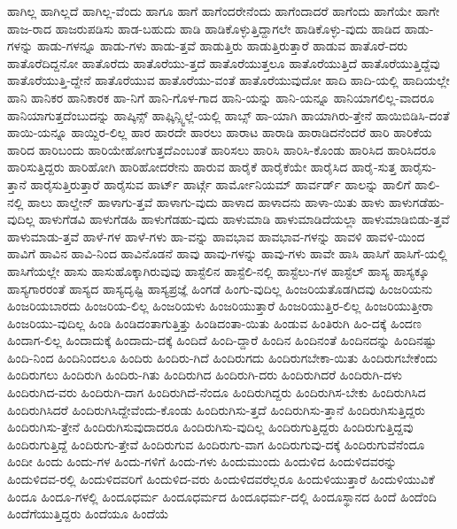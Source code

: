 {ಹಾಗಿಲ್ಲ
ಹಾಗಿಲ್ಲದೆ
ಹಾಗಿಲ್ಲ-ವೆಂದು
ಹಾಗೂ
ಹಾಗೆ
ಹಾಗೆಂದರೇನೆಂದು
ಹಾಗೆಂದಾದರೆ
ಹಾಗೆಂದು
ಹಾಗೆಯೇ
ಹಾಗೇ
ಹಾಜ-ರಾದ
ಹಾಜರುಪಡಿಸು
ಹಾಡ-ಬಹುದು
ಹಾಡಿ
ಹಾಡಿಕೊಳ್ಳುತ್ತಿದ್ದಾಗಲೇ
ಹಾಡಿಕೊಳ್ಳು-ವುದು
ಹಾಡಿದ
ಹಾಡು-ಗಳನ್ನು
ಹಾಡು-ಗಳನ್ನೂ
ಹಾಡು-ಗಳು
ಹಾಡು-ತ್ತವೆ
ಹಾಡುತ್ತಿರು
ಹಾಡುತ್ತಿರುತ್ತಾರೆ
ಹಾಡುವ
ಹಾತೊರೆ-ದರು
ಹಾತೊರೆದಿದ್ದನೋ
ಹಾತೊರೆದು
ಹಾತೊರೆಯು-ತ್ತದೆ
ಹಾತೊರೆಯುತ್ತಲೂ
ಹಾತೊರೆಯುತ್ತಿದೆ
ಹಾತೊರೆಯುತ್ತಿದ್ದೆವು
ಹಾತೊರೆಯುತ್ತಿ-ದ್ದೇನೆ
ಹಾತೊರೆಯುವ
ಹಾತೊರೆಯು-ವಂತೆ
ಹಾತೊರೆಯುವುದೋ
ಹಾದಿ
ಹಾದಿ-ಯಲ್ಲಿ
ಹಾದಿಯಲ್ಲೇ
ಹಾನಿ
ಹಾನಿಕರ
ಹಾನಿಕಾರಕ
ಹಾ-ನಿಗೆ
ಹಾನಿ-ಗೊಳ-ಗಾದ
ಹಾನಿ-ಯನ್ನು
ಹಾನಿ-ಯನ್ನೂ
ಹಾನಿಯಾಗಲಿಲ್ಲ-ವಾದರೂ
ಹಾನಿಯಾಗುತ್ತದೆಂಬುದನ್ನು
ಹಾಪ್ಕಿನ್ಸ್
ಹಾಫ್ಕಿನ್ಸ್ವಿಲ್ಲೆ-ಯಲ್ಲಿ
ಹಾಬ್ಸ್
ಹಾ-ಯಾಗಿ
ಹಾಯಾಗಿರು-ತ್ತೇನೆ
ಹಾಯಿಬಿಡಿಸಿ-ದಂತೆ
ಹಾಯಿ-ಯನ್ನೂ
ಹಾಯ್ದಿರ-ಲಿಲ್ಲ
ಹಾರ
ಹಾರದೇ
ಹಾರಲು
ಹಾರಾಟ
ಹಾರಾಡಿ
ಹಾರಾಡಿದನೆಂದರೆ
ಹಾರಿ
ಹಾರಿಕೆಯ
ಹಾರಿದ
ಹಾರಿಬಂದು
ಹಾರಿಯೇಹೋಗುತ್ತದೆಎಂಬಂತೆ
ಹಾರಿಸಲು
ಹಾರಿಸಿ
ಹಾರಿಸಿ-ಕೊಂಡು
ಹಾರಿಸಿದ
ಹಾರಿಸಿದರೂ
ಹಾರಿಸುತ್ತಿದ್ದರು
ಹಾರಿಹೋಗಿ
ಹಾರಿಹೋದರೇನು
ಹಾರುವ
ಹಾರೈಕೆ
ಹಾರೈಕೆಯೇ
ಹಾರೈಸಿದ
ಹಾರೈ-ಸುತ್ತ
ಹಾರೈಸು-ತ್ತಾನೆ
ಹಾರೈಸುತ್ತಿರುತ್ತಾರೆ
ಹಾರೈಸುವ
ಹಾರ್ಟ್
ಹಾರ್ಟ್ಗೆ
ಹಾರ್ಮೋನಿಯಮ್
ಹಾರ್ವರ್ಡ್
ಹಾಲನ್ನು
ಹಾಲಿಗೆ
ಹಾಲಿ-ನಲ್ಲಿ
ಹಾಲು
ಹಾಲ್ಡೇನ್
ಹಾಳಾಗು-ತ್ತವೆ
ಹಾಳಾಗು-ವುದು
ಹಾಳಾದ
ಹಾಳಾದನು
ಹಾಳಾ-ಯಿತು
ಹಾಳು
ಹಾಳುಗಡೆಹು-ವುದಿಲ್ಲ
ಹಾಳುಗೆಡವಿ
ಹಾಳುಗೆಡಹಿ
ಹಾಳುಗೆಡಹು-ವುದು
ಹಾಳುಮಾಡಿ
ಹಾಳುಮಾಡಿದೆಯಲ್ಲಾ
ಹಾಳುಮಾಡಿಬಿಡು-ತ್ತವೆ
ಹಾಳುಮಾಡು-ತ್ತವೆ
ಹಾಳೆ-ಗಳ
ಹಾಳೆ-ಗಳು
ಹಾ-ವನ್ನು
ಹಾವಭಾವ
ಹಾವಭಾವ-ಗಳನ್ನು
ಹಾವಳಿ
ಹಾವಳಿ-ಯಿಂದ
ಹಾವಿಗೆ
ಹಾವಿನ
ಹಾವಿ-ನಿಂದ
ಹಾವಿನೊಡನೆ
ಹಾವು
ಹಾವು-ಗಳನ್ನು
ಹಾವು-ಗಳು
ಹಾವೇ
ಹಾಸಿ
ಹಾಸಿಗೆ
ಹಾಸಿಗೆ-ಯಲ್ಲಿ
ಹಾಸಿಗೆಯಲ್ಲೇ
ಹಾಸು
ಹಾಸುಹೊಕ್ಕಾಗಿರುವುವು
ಹಾಸ್ಟೆಲಿನ
ಹಾಸ್ಟೆಲಿ-ನಲ್ಲಿ
ಹಾಸ್ಟೆಲು-ಗಳ
ಹಾಸ್ಟೆಲ್
ಹಾಸ್ಯ
ಹಾಸ್ಯಕ್ಕೂ
ಹಾಸ್ಯಗಾರರಂತೆ
ಹಾಸ್ಯದ
ಹಾಸ್ಯದೃಷ್ಟಿ
ಹಾಸ್ಯಪ್ರಜ್ಞೆ
ಹಿಂಗಡೆ
ಹಿಂಗು-ವುದಿಲ್ಲ
ಹಿಂಜರಿಯತೊಡಗಿದವು
ಹಿಂಜರಿಯನು
ಹಿಂಜರಿಯಬಾರದು
ಹಿಂಜರಿಯ-ಲಿಲ್ಲ
ಹಿಂಜರಿಯಳು
ಹಿಂಜರಿಯುತ್ತಾರೆ
ಹಿಂಜರಿಯುತ್ತಿರ-ಲಿಲ್ಲ
ಹಿಂಜರಿಯುತ್ತೀರಾ
ಹಿಂಜರಿಯು-ವುದಿಲ್ಲ
ಹಿಂಡಿ
ಹಿಂಡಿದಂತಾಗುತ್ತಿತ್ತು
ಹಿಂಡಿದಂತಾ-ಯಿತು
ಹಿಂಡುವ
ಹಿಂತಿರುಗಿ
ಹಿಂ-ದಕ್ಕೆ
ಹಿಂದಣ
ಹಿಂದಾಗ-ಲಿಲ್ಲ
ಹಿಂದಾದುಕ್ಕೆ
ಹಿಂದಾದು-ದಕ್ಕೆ
ಹಿಂದಿದೆ
ಹಿಂದಿ-ದ್ದಾರೆ
ಹಿಂದಿನ
ಹಿಂದಿನಂತೆ
ಹಿಂದಿನದನ್ನು
ಹಿಂದಿನಷ್ಟು
ಹಿಂದಿ-ನಿಂದ
ಹಿಂದಿನಿಂದಲೂ
ಹಿಂದಿರು
ಹಿಂದಿರು-ಗಿದೆ
ಹಿಂದಿರುಗದು
ಹಿಂದಿರುಗಬೇಕಾ-ಯಿತು
ಹಿಂದಿರುಗಬೇಕೆಂದು
ಹಿಂದಿರುಗಲು
ಹಿಂದಿರುಗಿ
ಹಿಂದಿರು-ಗಿತು
ಹಿಂದಿರುಗಿದ
ಹಿಂದಿರುಗಿ-ದರು
ಹಿಂದಿರುಗಿದರೆ
ಹಿಂದಿರುಗಿ-ದಳು
ಹಿಂದಿರುಗಿದ-ವರು
ಹಿಂದಿರುಗಿ-ದಾಗ
ಹಿಂದಿರುಗಿದೆ-ನೆಂದೂ
ಹಿಂದಿರುಗಿದ್ದರು
ಹಿಂದಿರುಗಿಸ-ಬೇಕು
ಹಿಂದಿರುಗಿಸಿದ
ಹಿಂದಿರುಗಿಸಿದರೆ
ಹಿಂದಿರುಗಿಸಿದ್ದೇವೆಂದು-ಕೊಂಡು
ಹಿಂದಿರುಗಿಸು-ತ್ತದೆ
ಹಿಂದಿರುಗಿಸು-ತ್ತಾನೆ
ಹಿಂದಿರುಗಿಸುತ್ತಿದ್ದರು
ಹಿಂದಿರುಗಿಸು-ತ್ತೇನೆ
ಹಿಂದಿರುಗಿಸುವುದಾದರೂ
ಹಿಂದಿರುಗಿಸು-ವುದಿಲ್ಲ
ಹಿಂದಿರುಗುತ್ತಿದ್ದರು
ಹಿಂದಿರುಗುತ್ತಿದ್ದವು
ಹಿಂದಿರುಗುತ್ತಿದ್ದೆ
ಹಿಂದಿರುಗು-ತ್ತೇವೆ
ಹಿಂದಿರುಗುವ
ಹಿಂದಿರುಗು-ವಾಗ
ಹಿಂದಿರುಗುವು-ದಕ್ಕೆ
ಹಿಂದಿರುಗುವೆನೆಂದೂ
ಹಿಂದೀ
ಹಿಂದು
ಹಿಂದು-ಗಳ
ಹಿಂದು-ಗಳಿಗೆ
ಹಿಂದು-ಗಳು
ಹಿಂದುಮುಂದು
ಹಿಂದುಳಿದ
ಹಿಂದುಳಿದವರನ್ನು
ಹಿಂದುಳಿದವ-ರಲ್ಲಿ
ಹಿಂದುಳಿದವರಿಗೆ
ಹಿಂದುಳಿದ-ವರು
ಹಿಂದುಳಿದವರೆಲ್ಲರೂ
ಹಿಂದುಳಿಯುತ್ತಾರೆ
ಹಿಂದುಳಿಯುವಿಕೆ
ಹಿಂದೂ
ಹಿಂದೂ-ಗಳಲ್ಲಿ
ಹಿಂದೂಧರ್ಮ
ಹಿಂದೂಧರ್ಮದ
ಹಿಂದೂಧರ್ಮ-ದಲ್ಲಿ
ಹಿಂದೂಸ್ಥಾನದ
ಹಿಂದೆ
ಹಿಂದೆಂದಿ
ಹಿಂದೆಗೆಯುತ್ತಿದ್ದರು
ಹಿಂದೆಯೂ
ಹಿಂದೆಯೆ
}
